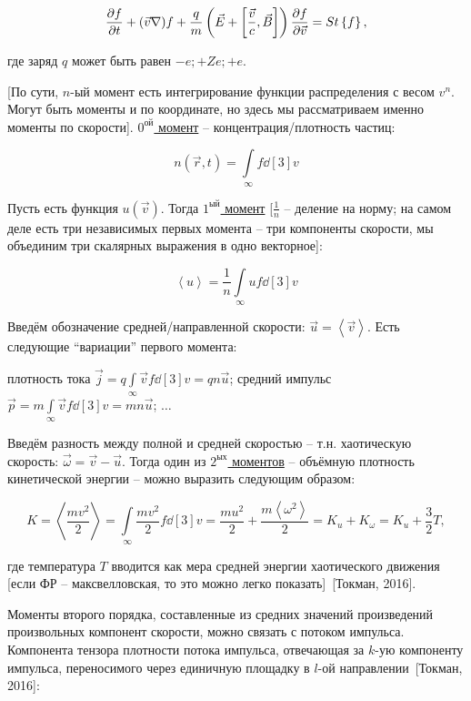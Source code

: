 \documentclass[10pt, a4paper]{article}
\newcommand{\Tokman}{~[Токман, 2016]}
\begin{document}
\begin{equation*}
	\pdv{f}{t}+(\vec{v}\nabla)f+\frac{q}{m}\left(\vec{E}+\left[\frac{\vec{v}}{c}, \vec{B}\right]\right)\pdv{f}{\vec{v}}=St\left\lbrace f\right\rbrace,
\end{equation*}

где заряд $q$ может быть равен $-e; +Ze; +e$.

[По сути, $n$-ый момент есть интегрирование функции распределения с весом $v^n$. Могут быть моменты и по координате, но здесь мы рассматриваем именно моменты по скорости]. \uline{$0^\text{ой}$ момент} -- концентрация/плотность частиц:

\begin{equation*}
	n(\vec{r}, t) = \int\limits_{\infty} f\dd[3]{v}
\end{equation*}

Пусть есть функция $u(\vec{v})$. Тогда \uline{$1^\text{ый}$ момент} [$\frac{1}{n}$ -- деление на норму; на самом деле есть три независимых первых момента -- три компоненты скорости, мы объединим три скалярных выражения в одно векторное]:

\begin{equation*}
	\left\langle u \right\rangle = \frac{1}{n}\int\limits_{\infty}uf\dd[3]{v}
\end{equation*}

Введём обозначение средней/направленной скорости: $\vec{u} = \left\langle \vec{v} \right\rangle$. Есть следующие ``вариации'' первого момента:

плотность тока $\vec{j} = q\int\limits_\infty\vec{v}f\dd[3]{v}=qn\vec{u}$; средний импульс $\vec{p} = m\int\limits_\infty\vec{v}f\dd[3]{v}=mn\vec{u}$; $\ldots$

Введём разность между полной и средней скоростью -- т.н. хаотическую скорость: $\vec{\omega}=\vec{v}-\vec{u}$. Тогда один из \uline{$2^\text{ых}$ моментов} -- объёмную плотность кинетической энергии -- можно выразить следующим образом:

\begin{equation*}
	K = \left\langle\frac{mv^2}{2}\right\rangle = \int\limits_\infty \frac{mv^2}{2}f\dd[3]{v} = \frac{mu^2}{2} + \frac{m\left\langle\omega^2\right\rangle }{2} = K_u + K_\omega = K_u + \frac{3}{2}T,
\end{equation*}

где температура $T$ вводится как мера средней энергии хаотического движения [если ФР -- максвелловская, то это можно легко показать]\Tokman. 

Моменты второго порядка, составленные из средних значений произведений произвольных компонент скорости, можно связать с потоком импульса. Компонента тензора плотности потока импульса, отвечающая за $k$-ую компоненту импульса, переносимого через единичную площадку в $l$-ой направлении\Tokman:
\end{document}
